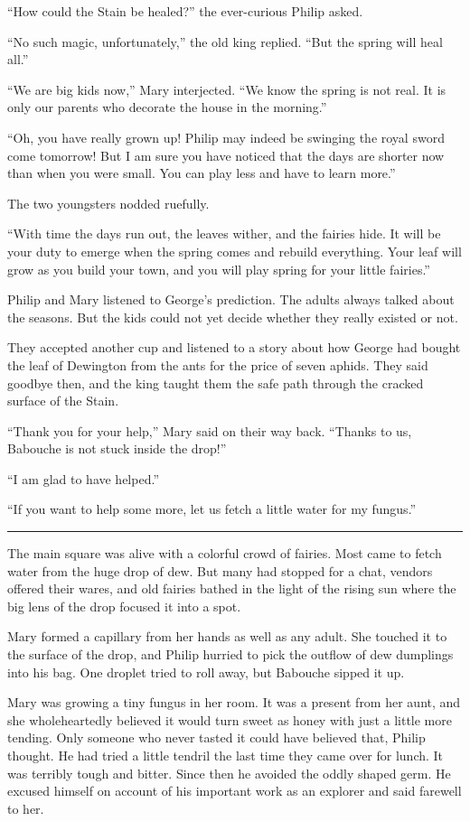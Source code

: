 \documentclass[10pt]{memoir}
\renewcommand{\pfbreakdisplay}{\bigskip \ding{166} \bigskip}
\newcommand{\secbreak}{\fancybreak{\pfbreakdisplay}}
\begin{document}
``How could the Stain be healed?'' the ever-curious Philip asked.

``No such magic, unfortunately,'' the old king replied. ``But the spring will
heal all.''

``We are big kids now,'' Mary interjected. ``We know the spring is not real. It
is only our parents who decorate the house in the morning.''

``Oh, you have really grown up! Philip may indeed be swinging the royal sword
come tomorrow! But I am sure you have noticed that the days are shorter now
than when you were small. You can play less and have to learn more.''

The two youngsters nodded ruefully.

``With time the days run out, the leaves wither, and the fairies hide. It will
be your duty to emerge when the spring comes and rebuild everything. Your leaf
will grow as you build your town, and you will play spring for your little
fairies.''

Philip and Mary listened to George's prediction. The adults always talked about
the seasons. But the kids could not yet decide whether they really existed or
not.

They accepted another cup and listened to a story about how George had bought
the leaf of Dewington from the ants for the price of seven aphids. They said
goodbye then, and the king taught them the safe path through the cracked
surface of the Stain.

``Thank you for your help,'' Mary said on their way back. ``Thanks to us,
Babouche is not stuck inside the drop!''

``I am glad to have helped.''

``If you want to help some more, let us fetch a little water for my fungus.''

\secbreak

The main square was alive with a colorful crowd of fairies. Most came to fetch
water from the huge drop of dew. But many had stopped for a chat, vendors
offered their wares, and old fairies bathed in the light of the rising sun
where the big lens of the drop focused it into a spot.

Mary formed a capillary from her hands as well as any adult. She touched it to
the surface of the drop, and Philip hurried to pick the outflow of dew
dumplings into his bag. One droplet tried to roll away, but Babouche sipped it
up.

Mary was growing a tiny fungus in her room. It was a present from her aunt, and
she wholeheartedly believed it would turn sweet as honey with just a little
more tending. Only someone who never tasted it could have believed that, Philip
thought. He had tried a little tendril the last time they came over for lunch.
It was terribly tough and bitter. Since then he avoided the oddly shaped germ.
He excused himself on account of his important work as an explorer and said
farewell to her.
\end{document}
